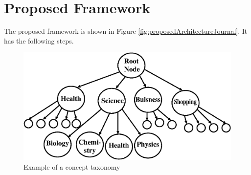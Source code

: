 \section{Proposed Framework}
\label{ch4Framework}

The proposed framework is shown in Figure \ref{fig:proposedArchitectureJournal}. It has the following steps.


\begin{figure}
	\centering
	\includegraphics[scale=0.4]{visuals/our_taxonomy.eps}
	\caption{Example of a concept taxonomy}
	\label{taxonomy:example}
\end{figure}





